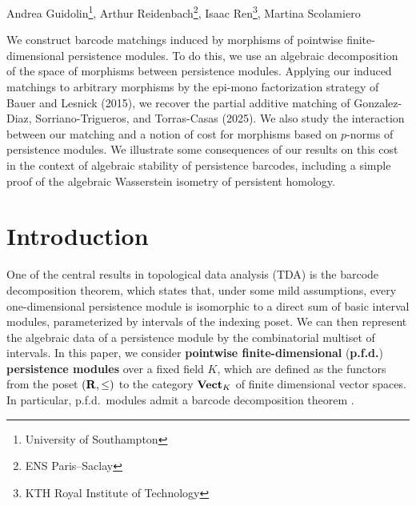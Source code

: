 
\newrefsection

\setcounter{footnotevalue}{\value{footnote}}
\setcounter{footnote}{0}
\renewcommand*{\thefootnote}{\roman{footnote}}
{\sffamily
  Andrea Guidolin\footnote{University of Southampton},
  Arthur Reidenbach\footnote{ENS Paris--Saclay},
  Isaac Ren\footnote{KTH Royal Institute of Technology},
  Martina Scolamiero\addtocounter{footnote}{-1}\footnotemark
}
\setcounter{footnote}{\value{footnotevalue}}
\renewcommand*{\thefootnote}{\arabic{footnote}}
\vspace{1ex}

\begin{paperabstract}
  We construct barcode matchings induced by morphisms of pointwise finite-dimensional persistence modules. To do this, we use an algebraic decomposition of the space of morphisms between persistence modules.
  Applying our induced matchings to arbitrary morphisms by the epi-mono factorization strategy of Bauer and Lesnick (2015), we recover the partial additive matching of Gonzalez-Diaz, Sorriano-Trigueros, and Torras-Casas (2025).
  We also study the interaction between our matching and a notion of cost for morphisms based on $p$-norms of persistence modules. We illustrate some consequences of our results on this cost in the context of algebraic stability of persistence barcodes, including a simple proof of the algebraic Wasserstein isometry of persistent homology.
\end{paperabstract}

\section{Introduction}

One of the central results in topological data analysis (TDA) is the barcode decomposition theorem, which states that, under some mild assumptions, every one-dimensional persistence module is isomorphic to a direct sum of basic interval modules, parameterized by intervals of the indexing poset. We can then represent the algebraic data of a persistence module by the combinatorial multiset of intervals. In this paper, we consider \textbf{pointwise finite-dimensional} (\textbf{p.f.d.}) \textbf{persistence modules} over a fixed field $K$, which are defined as the functors from the poset $(\mathbf{R}, \mathord{\leq})$ to the category $\operatorname{\mathbf{Vect}}_K$ of finite dimensional vector spaces. In particular, p.f.d.\ modules admit a barcode decomposition theorem \cite{CrawleyBoevey2015,BotnanCrawleyBoevey2020}.

